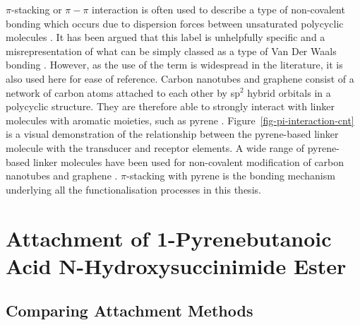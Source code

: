 \documentclass[
  a4paper,
]{scrbook}
\begin{document}
\(\pi\)-stacking or \(\pi-\pi\) interaction is often used to describe a
type of non-covalent bonding which occurs due to dispersion forces
between unsaturated polycyclic molecules \autocite{Perez2015}. It has
been argued that this label is unhelpfully specific and a
misrepresentation of what can be simply classed as a type of Van Der
Waals bonding \autocite{Martinez2012,Perez2015}. However, as the use of
the term is widespread in the literature, it is also used here for ease
of reference. Carbon nanotubes and graphene consist of a network of
carbon atoms attached to each other by sp\(^{2}\) hybrid orbitals in a
polycyclic structure. They are therefore able to strongly interact with
linker molecules with aromatic moieties, such as pyrene
\autocite{Hermanson2013-16,Perez2015,Mishyn2022}.
Figure~\ref{fig-pi-interaction-cnt} is a visual demonstration of the
relationship between the pyrene-based linker molecule with the
transducer and receptor elements. A wide range of pyrene-based linker
molecules have been used for non-covalent modification of carbon
nanotubes and graphene \autocite{Zhou2019}. \(\pi\)-stacking with pyrene
is the bonding mechanism underlying all the functionalisation processes
in this thesis.

\hypertarget{sec-PBASE}{%
\section{Attachment of 1-Pyrenebutanoic Acid N-Hydroxysuccinimide
Ester}\label{sec-PBASE}}

\hypertarget{comparing-attachment-methods}{%
\subsection{Comparing Attachment
Methods}\label{comparing-attachment-methods}}
\end{document}
